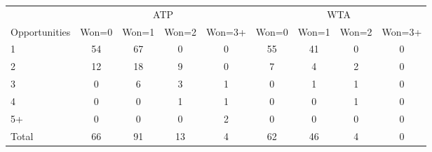 \begin{tabular}{l cccc cccc}
\toprule
 & \multicolumn{4}{c}{ATP} & \multicolumn{4}{c}{WTA} \\
\cmidrule(lr){2-5} \cmidrule(lr){6-9}
Opportunities & Won=0 & Won=1 & Won=2 & Won=3+ & Won=0 & Won=1 & Won=2 & Won=3+ \\
\midrule
1 & 54 & 67 & 0 & 0 & 55 & 41 & 0 & 0 \\
2 & 12 & 18 & 9 & 0 & 7 & 4 & 2 & 0 \\
3 & 0 & 6 & 3 & 1 & 0 & 1 & 1 & 0 \\
4 & 0 & 0 & 1 & 1 & 0 & 0 & 1 & 0 \\
5+ & 0 & 0 & 0 & 2 & 0 & 0 & 0 & 0 \\
\midrule
Total & 66 & 91 & 13 & 4 & 62 & 46 & 4 & 0 \\
\bottomrule
\end{tabular}
